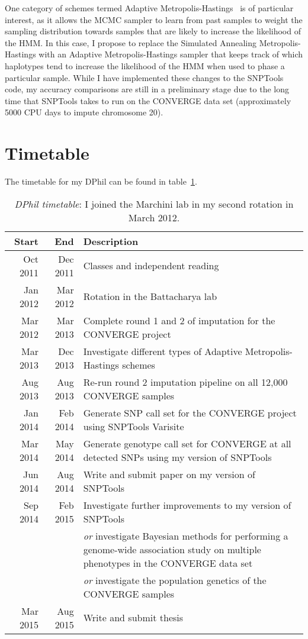 \documentclass[a4paper]{article}
\begin{document}
One
category of schemes termed Adaptive
Metropolis-Hastings~\autocite{Haario2001} is of particular interest, as it allows the
MCMC sampler to learn from past
samples to weight the sampling distribution towards samples that
are likely to increase the likelihood of the HMM.  In this case, I
propose to replace the Simulated Annealing Metropolis-Hastings with an
Adaptive Metropolis-Hastings
sampler that keeps track of which haplotypes tend to increase the
likelihood of the HMM when used to phase a particular sample. While I have
implemented these changes to the SNPTools code, my accuracy
comparisons are still in a preliminary stage due to the long time that
SNPTools takes to run on the CONVERGE data set (approximately 5000 CPU
days to impute chromosome 20).

\section*{Timetable}
The timetable for my DPhil can be found in table~\ref{tab:timetable}.

\begin{table}[htbp]
  \centering
  \begin{tabularx}{\textwidth}{rrX}
    \toprule
    Start & End & Description\\
    \midrule
    Oct 2011 & Dec 2011 & Classes and independent reading\\
    Jan 2012 & Mar 2012 & Rotation in the Battacharya lab\\
    Mar 2012 & Mar 2013 & Complete round 1 and 2 of imputation for the
    CONVERGE project\\
    Mar 2013 & Dec 2013 & Investigate different types of Adaptive Metropolis-Hastings
    schemes\\
    Aug 2013 & Aug 2013 & Re-run round 2 imputation pipeline on
    all 12,000 CONVERGE samples\\
    Jan 2014 & Feb 2014 & Generate SNP call set for the CONVERGE
    project using SNPTools Varisite\\
    Mar 2014 & May 2014 & Generate genotype call set for CONVERGE at
    all detected SNPs using my version of SNPTools\\
    Jun 2014 & Aug 2014 & Write and submit paper on my version of
    SNPTools\\
    Sep 2014 & Feb 2015 & Investigate further improvements to my
    version of SNPTools\\
    & & \emph{or} investigate Bayesian methods for performing
    a genome-wide association study on multiple phenotypes in the
    CONVERGE data set\\
    & & \emph{or} investigate the population genetics of the
    CONVERGE samples\\
    Mar 2015 & Aug 2015 & Write and submit thesis\\
    \bottomrule
  \end{tabularx}
  \caption{\emph{DPhil timetable}: I joined the Marchini lab in my
    second rotation in March 2012.}
  \label{tab:timetable}
\end{table}
\end{document}
